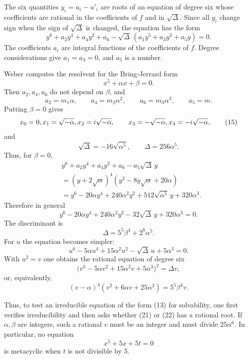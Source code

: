 \documentclass[11pt]{article}
\begin{document}
The six quantities $y_i=u_i-u'_i$ are roots of an equation of degree six whose coefficients are rational in the coefficients of $f$ and in $\sqrt\Delta$. Since all $y_i$ change sign when the sign of $\sqrt\Delta$ is changed, the equation has the form
\[
 y^6+a_2y^4+a_4y^2+a_6-
 \sqrt\Delta\,(a_1y^5+a_3y^3+a_5y)=0.                            \tag{12}
\]
The coefficients $a_i$ are integral functions of the coefficients of $f$. Degree considerations give $a_1=a_3=0$, and $a_5$ is a number.

Weber computes the resolvent for the Bring-Jerrard form
\[
  x^5+\alpha x+\beta=0.                                          \tag{13}
\]
Then $a_2,a_4,a_6$ do not depend on $\beta$, and
\[
  a_2=m_1\alpha,
  \qquad a_4=m_2\alpha^2,
  \qquad a_6=m_3\alpha^3,
  \qquad a_5=m.                                                   \tag{14}
\]
Putting $\beta=0$ gives
\[
 x_0=0,\\ x_1=\sqrt{-\alpha},\\ x_2=i\sqrt{-\alpha},
 \qquad x_3=-\sqrt{-\alpha},\\ x_4=-i\sqrt{-\alpha},              \tag{15}
\]
and
\[
  \sqrt\Delta=-16\sqrt{\alpha^5},
  \qquad \Delta=256\alpha^5.                                     \tag{16}
\]
Thus, for $\beta=0$,
\[
\begin{aligned}
&y^6+a_2y^4+a_4y^2+a_6-a_5\sqrt\Delta\,y\\
&=(y+2\sqrt\alpha)^4(y^2-8y\sqrt\alpha+20\alpha)\\
&=y^6-20\alpha y^4+240\alpha^2 y^2
  +512\sqrt{\alpha^5}\,y+320\alpha^3 .
\end{aligned}                                                     \tag{17}
\]
Therefore in general
\[
  y^6-20\alpha y^4+240\alpha^2y^2
  -32\sqrt\Delta\,y+320\alpha^3=0.                              \tag{18}
\]
The discriminant is
\[
  \Delta=5^5\beta^4+2^8\alpha^5.                                \tag{19}
\]
For $u$ the equation becomes simpler:
\[
  u^6-5\alpha u^4+15\alpha^2u^2-
  \sqrt\Delta\,u+5\alpha^3=0.                                    \tag{20}
\]
With $u^2=v$ one obtains the rational equation of degree six
\[
  \bigl(v^3-5\alpha v^2+15\alpha^2v+5\alpha^3\bigr)^2
  =\Delta v,                                                     \tag{21}
\]
or, equivalently,
\[
  (v-
\alpha)^4(v^2+6\alpha v+25\alpha^2)=5^5\beta^4 v.           \tag{22}
\]

Thus, to test an irreducible equation of the form (13) for solvability, one first verifies irreducibility and then asks whether (21) or (22) has a rational root. If $\alpha,\beta$ are integers, such a rational $v$ must be an integer and must divide $25\alpha^6$. In particular, no equation
\[
  x^5+5x+5t=0
\]
is metacyclic when $t$ is not divisible by $5$.
\end{document}
